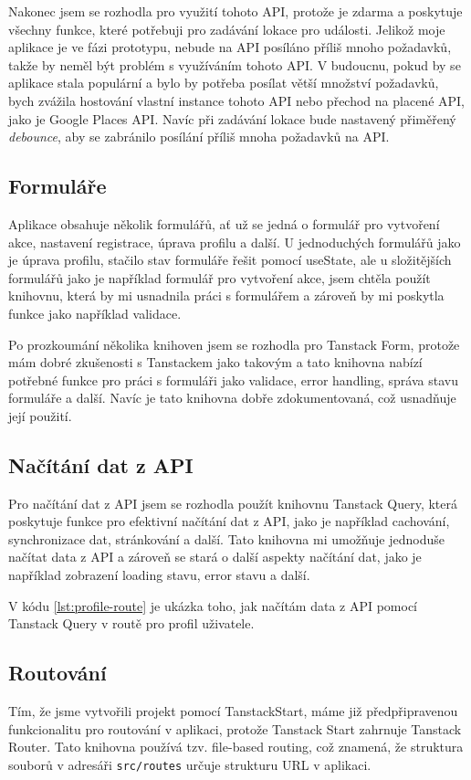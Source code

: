 Nakonec jsem se rozhodla pro využití tohoto API, protože je zdarma a poskytuje všechny funkce, které potřebuji pro zadávání lokace pro události. Jelikož moje aplikace je ve fázi prototypu, nebude na API posíláno příliš mnoho požadavků, takže by neměl být problém s využíváním tohoto API. V budoucnu, pokud by se aplikace stala populární a bylo by potřeba posílat větší množství požadavků, bych zvážila hostování vlastní instance tohoto API nebo přechod na placené API, jako je Google Places API. Navíc při zadávání lokace bude nastavený přiměřený \textit{debounce}, aby se zabránilo posílání příliš mnoha požadavků na API.

\subsection{Formuláře}
Aplikace obsahuje několik formulářů, ať už se jedná o formulář pro vytvoření akce, nastavení registrace, úprava profilu a další. U jednoduchých formulářů jako je úprava profilu, stačilo stav formuláře řešit pomocí useState, ale u složitějších formulářů jako je například formulář pro vytvoření akce, jsem chtěla použít knihovnu, která by mi usnadnila práci s formulářem a zároveň by mi poskytla funkce jako například validace. 

Po prozkoumání několika knihoven jsem se rozhodla pro Tanstack Form, protože mám dobré zkušenosti s Tanstackem jako takovým a tato knihovna nabízí potřebné funkce pro práci s formuláři jako validace, error handling, správa stavu formuláře a další. Navíc je tato knihovna dobře zdokumentovaná, což usnadňuje její použití. \cite{tanstack_form}

\subsection{Načítání dat z API}
Pro načítání dat z API jsem se rozhodla použít knihovnu Tanstack Query, která poskytuje funkce pro efektivní načítání dat z API, jako je například cachování, synchronizace dat, stránkování a další. Tato knihovna mi umožňuje jednoduše načítat data z API a zároveň se stará o další aspekty načítání dat, jako je například zobrazení loading stavu, error stavu a další. \cite{tanstack_query_react_overview}

V kódu \ref{lst:profile-route} je ukázka toho, jak načítám data z API pomocí Tanstack Query v routě pro profil uživatele. 

\subsection{Routování}
Tím, že jsme vytvořili projekt pomocí TanstackStart, máme již předpřipravenou funkcionalitu pro routování v aplikaci, protože Tanstack Start zahrnuje Tanstack Router. Tato knihovna používá tzv. file-based routing, což znamená, že struktura souborů v adresáři \texttt{src/routes} určuje strukturu URL v aplikaci. \cite{tanstack_react_routing_guide}

